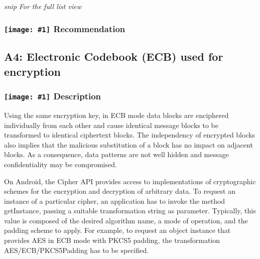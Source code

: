 \documentclass[12p]{article}
\newcommand{\icon}[1]{\texttt{[image: \#1]}}
\begin{document}




\textit{snip}
\newline \textsl{For the full list view }
\subsubsection*{\protect\icon{/home/miki/Documents/GITHUB/AndroidPermissions/python/vulns/report_icons/basic_todo.png} Recommendation}

\subsection{A4: Electronic Codebook (ECB) used for encryption}
\subsubsection*{\protect\icon{/home/miki/Documents/GITHUB/AndroidPermissions/python/vulns/report_icons/basic_sheet.png} Description}

            Using the same encryption key, in ECB mode data blocks are enciphered individually 
            from each other and cause identical message blocks to be transformed to identical ciphertext 
            blocks. The independency of encrypted blocks also implies that the malicious substitution of a 
            block has no impact on adjacent blocks. As a consequence, data patterns are not well hidden and 
            message confidentiality may be compromised.
            
            On Android, the Cipher API provides access to implementations of cryptographic schemes
            for the encryption and decryption of arbitrary data. To request an instance of a particular cipher,
            an application has to invoke the method getInstance, passing a suitable transformation string as
            parameter. Typically, this value is composed of the desired algorithm name, a mode of operation,
            and the padding scheme to apply. For example, to request an object instance that provides AES in
            ECB mode with PKCS5 padding, the transformation AES/ECB/PKCS5Padding has to be specified.
            
\end{document}
